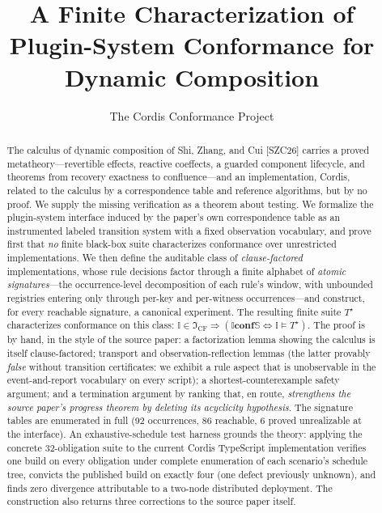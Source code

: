\documentclass[sigplan,screen,review,nonacm]{acmart}
\newcommand{\Spec}{\ensuremath{\mathbb S}}
\newcommand{\Impl}{\ensuremath{\mathbb I}}
\newcommand{\conf}{\mathrel{\mathbf{conf}}}
\newcommand{\CF}{\ensuremath{\mathfrak I_{\mathrm{CF}}}}
\newcommand{\Tstar}{\ensuremath{T^{\star}}}
\newcommand{\SZC}{[SZC26]}
\begin{document}
\title{A Finite Characterization of Plugin-System Conformance for Dynamic Composition}

\author{The Cordis Conformance Project}

\renewcommand{\shortauthors}{Cordis Conformance}

\begin{abstract}
The calculus of dynamic composition of Shi, Zhang, and Cui \SZC{} carries a proved
metatheory---revertible effects, reactive coeffects, a guarded component lifecycle,
and theorems from recovery exactness to confluence---and an implementation, Cordis,
related to the calculus by a correspondence table and reference algorithms, but by
no proof. We supply the missing verification as a theorem about testing. We
formalize the plugin-system interface induced by the paper's own correspondence
table as an instrumented labeled transition system with a fixed observation
vocabulary, and prove first that \emph{no} finite black-box suite characterizes
conformance over unrestricted implementations. We then define the auditable class
of \emph{clause-factored} implementations, whose rule decisions factor through a
finite alphabet of \emph{atomic signatures}---the occurrence-level decomposition of
each rule's window, with unbounded registries entering only through per-key and
per-witness occurrences---and construct, for every reachable signature, a canonical
experiment. The resulting finite suite \Tstar{} characterizes conformance on this
class:
$\Impl \in \CF \Rightarrow (\Impl \conf \Spec \iff \Impl \models \Tstar)$.
The proof is by hand, in the style of the source paper: a factorization lemma
showing the calculus is itself clause-factored; transport and observation-reflection
lemmas (the latter provably \emph{false} without transition certificates: we exhibit
a rule aspect that is unobservable in the event-and-report vocabulary on every
script); a shortest-counterexample safety argument; and a termination argument by
ranking that, en route, \emph{strengthens the source paper's progress theorem by
deleting its acyclicity hypothesis}. The signature tables are enumerated in full
(92 occurrences, 86 reachable, 6 proved unrealizable at the interface). An
exhaustive-schedule test harness grounds the theory: applying the concrete
32-obligation suite to the current Cordis TypeScript implementation verifies one
build on every obligation under complete enumeration of each scenario's schedule
tree, convicts the published build on exactly four (one defect previously unknown),
and finds zero divergence attributable to a two-node distributed deployment. The
construction also returns three corrections to the source paper itself.
\end{abstract}
\end{document}
